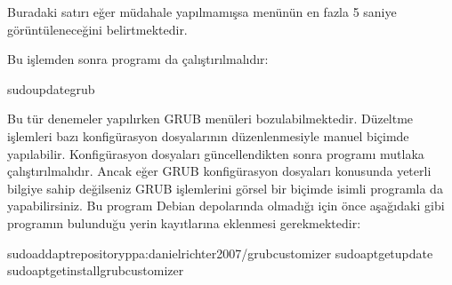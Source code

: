 \documentclass[a4paper,10pt,turkish]{sphinxmanual}
\begin{document}
\sphinxAtStartPar
Buradaki  satırı eğer müdahale yapılmamışsa menünün en fazla 5 saniye
görüntüleneceğini belirtmektedir.

\sphinxAtStartPar
Bu işlemden sonra  programı da çalıştırılmalıdır:

\begin{sphinxVerbatim}[commandchars=\\\{\}]
\PYGZdl{}sudoupdate\PYGZhy{}grub
\end{sphinxVerbatim}

\sphinxAtStartPar
Bu tür denemeler yapılırken GRUB menüleri bozulabilmektedir. Düzeltme işlemleri bazı konfigürasyon
dosyalarının düzenlenmesiyle manuel biçimde yapılabilir. Konfigürasyon dosyaları güncellendikten
sonra  programı mutlaka çalıştırılmalıdır. Ancak eğer GRUB konfigürasyon dosyaları
konusunda yeterli bilgiye sahip değilseniz GRUB işlemlerini görsel bir biçimde 
isimli programla da yapabilirsiniz. Bu program Debian depolarında olmadığı için önce aşağıdaki gibi
programın bulunduğu yerin  kayıtlarına eklenmesi gerekmektedir:

\begin{sphinxVerbatim}[commandchars=\\\{\}]
\PYGZdl{}sudoadd\PYGZhy{}apt\PYGZhy{}repositoryppa:danielrichter2007/grub\PYGZhy{}customizer
\PYGZdl{}sudoapt\PYGZhy{}getupdate
\PYGZdl{}sudoapt\PYGZhy{}getinstallgrub\PYGZhy{}customizer
\end{sphinxVerbatim}
\end{document}
